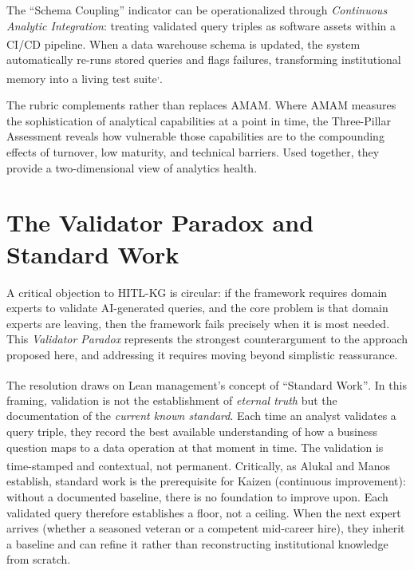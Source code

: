 \documentclass[
  american,
  11pt,
  letterpaper,
  oneside  ,captions=tableheading
]{scrartcl}
\begin{document}
The ``Schema Coupling'' indicator can be operationalized through
\emph{Continuous Analytic Integration}: treating validated query triples
as software assets within a CI/CD
pipeline\textsuperscript{}. When a data
warehouse schema is updated, the system automatically re-runs stored
queries and flags failures, transforming institutional memory into a
living test
suite\textsuperscript{,}.

The rubric complements rather than replaces AMAM. Where AMAM measures
the sophistication of analytical capabilities at a point in time, the
Three-Pillar Assessment reveals how vulnerable those capabilities are to
the compounding effects of turnover, low maturity, and technical
barriers. Used together, they provide a two-dimensional view of
analytics health.

\section{The Validator Paradox and Standard
Work}\label{the-validator-paradox-and-standard-work}

A critical objection to HITL-KG is circular: if the framework requires
domain experts to validate AI-generated queries, and the core problem is
that domain experts are leaving, then the framework fails precisely when
it is most needed. This \emph{Validator Paradox} represents the
strongest counterargument to the approach proposed here, and addressing
it requires moving beyond simplistic reassurance.

The resolution draws on Lean management's concept of ``Standard
Work''\textsuperscript{}. In this framing,
validation is not the establishment of \emph{eternal truth} but the
documentation of the \emph{current known standard}. Each time an analyst
validates a query triple, they record the best available understanding
of how a business question maps to a data operation at that moment in
time. The validation is time-stamped and contextual, not permanent.
Critically, as Alukal and
Manos\textsuperscript{} establish, standard
work is the prerequisite for Kaizen (continuous improvement): without a
documented baseline, there is no foundation to improve upon. Each
validated query therefore establishes a floor, not a ceiling. When the
next expert arrives (whether a seasoned veteran or a competent
mid-career hire), they inherit a baseline and can refine it rather than
reconstructing institutional knowledge from scratch.
\end{document}
